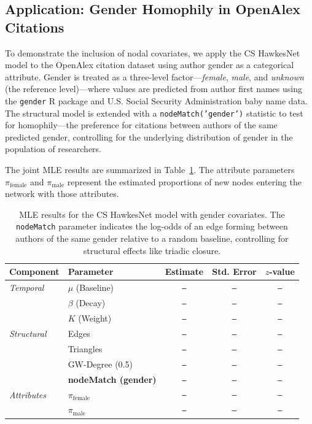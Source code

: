 \documentclass[12pt]{article}
\begin{document}
\subsection{Application: Gender Homophily in OpenAlex Citations}\label{app:gender_fit}

To demonstrate the inclusion of nodal covariates, we apply the CS HawkesNet model to the OpenAlex citation dataset using author gender as a categorical attribute. Gender is treated as a three-level factor—\textit{female}, \textit{male}, and \textit{unknown} (the reference level)—where values are predicted from author first names using the \texttt{gender} R package and U.S. Social Security Administration baby name data. The structural model is extended with a \texttt{nodeMatch('gender')} statistic to test for homophily—the preference for citations between authors of the same predicted gender, controlling for the underlying distribution of gender in the population of researchers.

The joint MLE results are summarized in Table~\ref{tab:gender_fit_results}. The attribute parameters $\pi_{\text{female}}$ and $\pi_{\text{male}}$ represent the estimated proportions of new nodes entering the network with those attributes. 

\begin{table}[H]
    \centering
    \small
    \begin{tabular}{llccc}
        \toprule
        Component & Parameter & Estimate & Std. Error & $z$-value \\
        \midrule
        \textit{Temporal} & $\mu$ (Baseline) & \texttt{---} & \texttt{---} & \texttt{---} \\
                  & $\beta$ (Decay) & \texttt{---} & \texttt{---} & \texttt{---} \\
                  & $K$ (Weight) & \texttt{---} & \texttt{---} & \texttt{---} \\
        \midrule
        \textit{Structural} & Edges & \texttt{---} & \texttt{---} & \texttt{---} \\
                  & Triangles & \texttt{---} & \texttt{---} & \texttt{---} \\
                  & GW-Degree (0.5) & \texttt{---} & \texttt{---} & \texttt{---} \\
                  & \textbf{nodeMatch (gender)} & \texttt{---} & \texttt{---} & \texttt{---} \\
        \midrule
        \textit{Attributes} & $\pi_{\text{female}}$ & \texttt{---} & \texttt{---} & \texttt{---} \\
                  & $\pi_{\text{male}}$ & \texttt{---} & \texttt{---} & \texttt{---} \\
        \bottomrule
    \end{tabular}
    \caption{MLE results for the CS HawkesNet model with gender covariates. The \texttt{nodeMatch} parameter indicates the log-odds of an edge forming between authors of the same gender relative to a random baseline, controlling for structural effects like triadic closure.}
    \label{tab:gender_fit_results}
\end{table}
\end{document}
